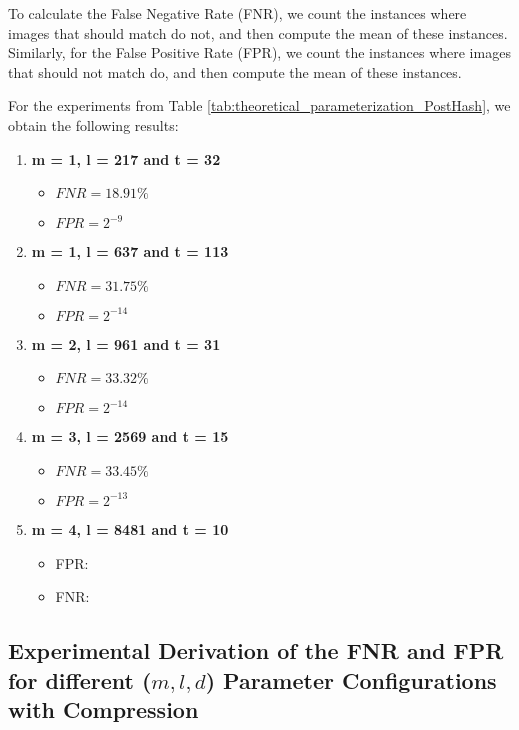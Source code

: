 To calculate the False Negative Rate (FNR), we count the instances where images that should match do not, and then compute the mean of these instances. Similarly, for the False Positive Rate (FPR), we count the instances where images that should not match do, and then compute the mean of these instances.

For the experiments from Table \ref{tab:theoretical_parameterization_PostHash}, we obtain the following results:

\begin{enumerate}
    \item \textbf{m = 1, l = 217 and t = 32}
        \begin{itemize}
            \item $FNR = 18.91\%$
            \item $FPR = 2^{-9}$
        \end{itemize}
    \item \textbf{m = 1, l = 637 and t = 113}
        \begin{itemize}
            \item $FNR = 31.75\%$
            \item $FPR = 2^{-14}$ 
        \end{itemize}
    \item \textbf{m = 2, l = 961 and t = 31}
        \begin{itemize}
            \item  $FNR = 33.32\%$
            \item $FPR = 2^{-14}$
        \end{itemize}
    \item \textbf{m = 3, l = 2569 and t = 15}
        \begin{itemize}
            \item $FNR = 33.45\%$
            \item $FPR = 2^{-13}$ 
        \end{itemize}
    \item \textbf{m = 4, l = 8481 and t = 10}
        \begin{itemize}
            \item FPR: 
            \item FNR: 
        \end{itemize}
\end{enumerate}


\subsection{Experimental Derivation of the FNR and FPR for different (\(m, l, d\)) Parameter Configurations with Compression}

